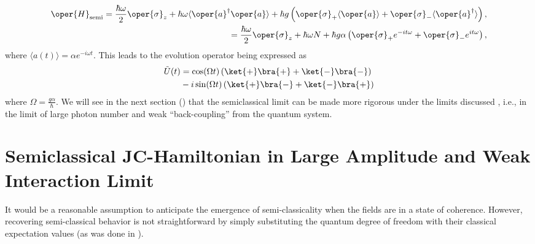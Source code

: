 \begin{equation}
    \label{eq:chap5_JCM_Hamiltonian_semi}
    \begin{aligned}
        \oper{H}_{\text{semi}} = \frac{\hbar\omega}{2} \oper{\sigma}_z + \hbar \omega \langle \oper{a}^\dagger \oper{a} \rangle
    + \hbar g \left( \oper{\sigma}_+ \langle \oper{a} \rangle + \oper{\sigma}_- \langle \oper{a}^\dagger \rangle \right),\\
    = \frac{\hbar\omega}{2} \oper{\sigma}_z + \hbar \omega N 
    + \hbar g \alpha\left( \oper{\sigma}_+ e^{-it\omega} + \oper{\sigma}_- e^{it\omega} \right),
    \end{aligned}
\end{equation}
where \(\langle a(t) \rangle = \alpha e^{-i\omega t}\). This leads to the evolution operator being expressed as
\begin{align}
        \tilde{U}(t) &= 
                \cos(\Omega t) \left(\ket{+}\bra{+} + 
                \ket{-}\bra{-} \right)  \nonumber\\
                &- i \sin(\Omega t)
                 \left( \ket{+}\bra{-}
                +\ket{-}\bra{+}\right)
\end{align}
where \(\Omega = \frac{g\alpha}{\hbar}\). We will see in the next section () that the semiclassical limit can be made more rigorous
under the limits discussed , i.e., in the limit of
large photon number and weak ``back-coupling'' from the quantum system.

\section{Semiclassical JC-Hamiltonian  in Large Amplitude and Weak Interaction Limit\label{sec:chap5_large_amplitude_weak_g}}
It would be a reasonable assumption to anticipate the emergence of semi-classicality when the fields are in a state of coherence. However, recovering semi-classical behavior is not straightforward by simply substituting the quantum degree of freedom with their classical expectation values (as was done in ). 

